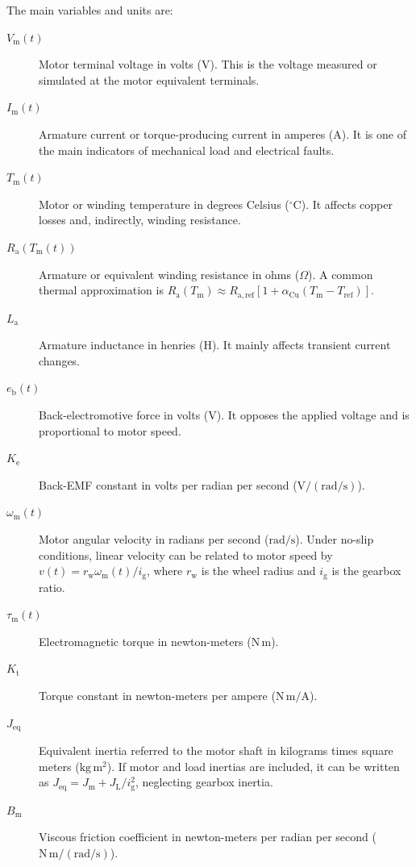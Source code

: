 The main variables and units are:
\begin{description}
    \item[$V_{\mathrm{m}}(t)$] Motor terminal voltage in volts ($\mathrm{V}$). This is the voltage measured or simulated at the motor equivalent terminals.
    \item[$I_{\mathrm{m}}(t)$] Armature current or torque-producing current in amperes ($\mathrm{A}$). It is one of the main indicators of mechanical load and electrical faults.
    \item[$T_{\mathrm{m}}(t)$] Motor or winding temperature in degrees Celsius ($^\circ\mathrm{C}$). It affects copper losses and, indirectly, winding resistance.
    \item[$R_{\mathrm{a}}(T_{\mathrm{m}}(t))$] Armature or equivalent winding resistance in ohms ($\Omega$). A common thermal approximation is $R_{\mathrm{a}}(T_{\mathrm{m}}) \approx R_{\mathrm{a,ref}}[1+\alpha_{\mathrm{Cu}}(T_{\mathrm{m}}-T_{\mathrm{ref}})]$.
    \item[$L_{\mathrm{a}}$] Armature inductance in henries ($\mathrm{H}$). It mainly affects transient current changes.
    \item[$e_{\mathrm{b}}(t)$] Back-electromotive force in volts ($\mathrm{V}$). It opposes the applied voltage and is proportional to motor speed.
    \item[$K_{\mathrm{e}}$] Back-EMF constant in volts per radian per second ($\mathrm{V}/(\mathrm{rad}/\mathrm{s})$).
    \item[$\omega_{\mathrm{m}}(t)$] Motor angular velocity in radians per second ($\mathrm{rad}/\mathrm{s}$). Under no-slip conditions, linear velocity can be related to motor speed by $v(t) = r_{\mathrm{w}} \omega_{\mathrm{m}}(t) / i_{\mathrm{g}}$, where $r_{\mathrm{w}}$ is the wheel radius and $i_{\mathrm{g}}$ is the gearbox ratio.
    \item[$\tau_{\mathrm{m}}(t)$] Electromagnetic torque in newton-meters ($\mathrm{N}\,\mathrm{m}$).
    \item[$K_{\mathrm{t}}$] Torque constant in newton-meters per ampere ($\mathrm{N}\,\mathrm{m}/\mathrm{A}$).
    \item[$J_{\mathrm{eq}}$] Equivalent inertia referred to the motor shaft in kilograms times square meters ($\mathrm{kg}\,\mathrm{m}^2$). If motor and load inertias are included, it can be written as $J_{\mathrm{eq}} = J_{\mathrm{m}} + J_{\mathrm{L}}/i_{\mathrm{g}}^2$, neglecting gearbox inertia.
    \item[$B_{\mathrm{m}}$] Viscous friction coefficient in newton-meters per radian per second ($\mathrm{N}\,\mathrm{m}/(\mathrm{rad}/\mathrm{s})$).

\end{description}
